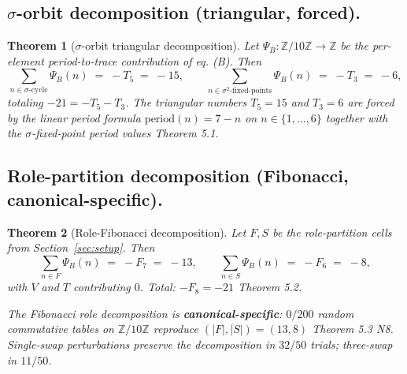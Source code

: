 \documentclass[11pt,reqno]{amsart}
\theoremstyle{plain}
\newtheorem{theorem}{Theorem}[section]
\theoremstyle{definition}
\theoremstyle{remark}
\newcommand{\Z}{\mathbb{Z}}
\newcommand{\sig}{\sigma}
\begin{document}
\subsection{$\sig$-orbit decomposition (triangular, forced).}
\begin{theorem}[$\sig$-orbit triangular decomposition]\label{thm:sigma-orbit}
Let $\Psi_{B}: \Z/10\Z \to \Z$ be the per-element period-to-trace
contribution of \cite{SandersBridgeWP9} eq. (B). Then
\[
  \sum_{n \in \sig\text{-cycle}} \Psi_{B}(n)
  \;=\; -T_{5}
  \;=\; -15,
  \qquad
  \sum_{n \in \sig^{2}\text{-fixed-points}} \Psi_{B}(n)
  \;=\; -T_{3}
  \;=\; -6,
\]
totaling $-21 = -T_{5} - T_{3}$. The triangular numbers $T_{5} = 15$
and $T_{3} = 6$ are forced by the linear period formula
$\mathrm{period}(n) = 7 - n$ on $n \in \{1, \ldots, 6\}$ together with
the $\sig$-fixed-point period values \cite{SandersBridgeWP9}
Theorem 5.1.
\end{theorem}

\subsection{Role-partition decomposition (Fibonacci,
canonical-specific).}
\begin{theorem}[Role-Fibonacci decomposition]\label{thm:role-fib}
Let $F, S$ be the role-partition cells from
Section~\ref{sec:setup}. Then
\[
  \sum_{n \in F} \Psi_{B}(n) \;=\; -F_{7} \;=\; -13,
  \qquad
  \sum_{n \in S} \Psi_{B}(n) \;=\; -F_{6} \;=\; -8,
\]
with $V$ and $T$ contributing $0$. Total: $-F_{8} = -21$
\cite{SandersBridgeWP9} Theorem 5.2.

The Fibonacci role decomposition is \textbf{canonical-specific}:
$0/200$ random commutative tables on $\Z/10\Z$ reproduce $(|F|, |S|) = (13, 8)$
\cite{SandersBridgeWP9} Theorem 5.3 N8. Single-swap perturbations
preserve the decomposition in $32/50$ trials; three-swap in $11/50$.
\end{theorem}
\end{document}
